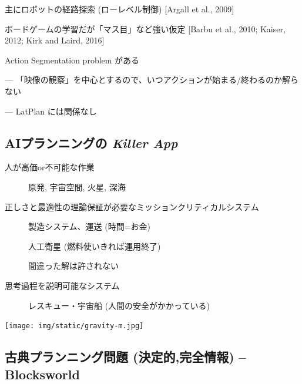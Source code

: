 主にロボットの経路探索 (ローレベル制御) [Argall et al., 2009]

ボードゲームの学習だが「マス目」など強い仮定 [Barbu et al., 2010; Kaiser, 2012; Kirk and Laird, 2016]

Action Segmentation problem がある

--- 「映像の観察」を中心とするので、いつアクションが始まる/終わるのか解らない

--- LatPlan には関係なし

\subsection{AIプランニングの \textbf{\emph{Killer App}}}
\label{sec:orgheadline50}

\begin{container-fluid}
\begin{row-fluid}
\begin{span7}
\begin{larger}
\begin{description}
\item[{人が高価or不可能な作業}] 原発, 宇宙空間, 火星, 深海
\item[{正しさと最適性の理論保証が必要なミッションクリティカルシステム}] 製造システム、運送 (時間=お金)

人工衛星 (燃料使いきれば運用終了)

間違った解は許されない
\item[{思考過程を説明可能なシステム}] レスキュー・宇宙船 (人間の安全がかかっている)
\end{description}
\end{larger}
\end{span7}
\begin{span5}


\texttt{[image: img/static/gravity-m.jpg]}
\end{span5}
\end{row-fluid}
\end{container-fluid}




\subsection{古典プランニング問題 (決定的,完全情報) -- Blocksworld}
\label{sec:orgheadline53}

